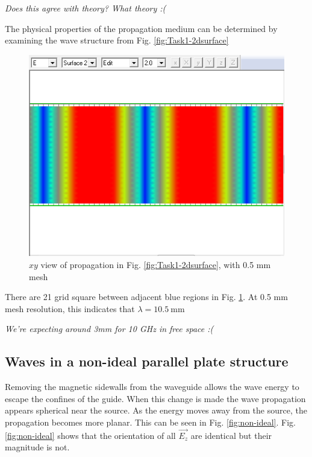 \emph{Does this agree with theory? What theory :(}

The physical properties of the propagation medium can be determined by examining the wave structure from Fig. \ref{fig:Task1-2dsurface}

\begin{figure}[tbph]
	\centering
	\includegraphics[width=0.7\linewidth]{graphics/Task1-scale}
	\caption{$xy$ view of propagation in Fig. \ref{fig:Task1-2dsurface}, with 0.5 mm mesh}
	\label{fig:Task1-scale}
\end{figure}

There are 21 grid square between adjacent blue regions in Fig. \ref{fig:Task1-scale}.
At 0.5 mm mesh resolution, this indicates that $\lambda = \SI{10.5}{\milli\meter}$

\emph{We're expecting around 3mm for 10 GHz in free space :(}

\subsection{Waves in a non-ideal parallel plate structure}\label{sec:non-ideal}
Removing the magnetic sidewalls from the waveguide allows the wave energy to escape the confines of the guide.
When this change is made the wave propagation appears spherical near the source.
As the energy moves away from the source, the propagation becomes more planar.
This can be seen in Fig. \ref{fig:non-ideal}.
Fig. \ref{fig:non-ideal} shows that the orientation of all $\vec{E_z}$ are identical but their magnitude is not.

